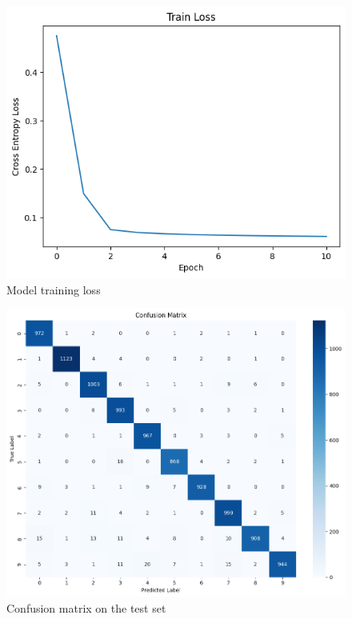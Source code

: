 \documentclass[conference]{IEEEtran}
\begin{document}
\begin{figure}[htbp]
\centerline{\includegraphics[width=0.6\linewidth]{loss.png}}
\caption{Model training loss}
\label{fig}
\end{figure}


\begin{figure}[htbp]
\centerline{\includegraphics[width=0.85\linewidth]{confusion matrix.png}}
\caption{Confusion matrix on the test set}
\label{fig}
\end{figure}
\end{document}
